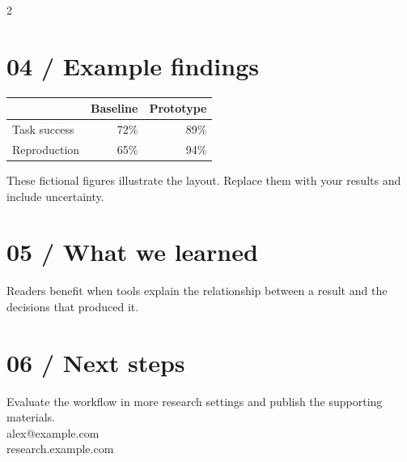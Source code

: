 \documentclass[20pt]{extarticle}
\begin{document}
\begin{multicols}{2}
\section*{04 / Example findings}
\begin{tabular}{lrr}\toprule & Baseline & Prototype\\\midrule Task success & 72\% & 89\%\\Reproduction & 65\% & 94\%\\\bottomrule\end{tabular}
These fictional figures illustrate the layout. Replace them with your results and include uncertainty.
\section*{05 / What we learned}Readers benefit when tools explain the relationship between a result and the decisions that produced it.
\section*{06 / Next steps}Evaluate the workflow in more research settings and publish the supporting materials.
\vspace{10mm}{\bfseries Get in touch}\\alex@example.com\\research.example.com
\end{multicols}
\end{document}

